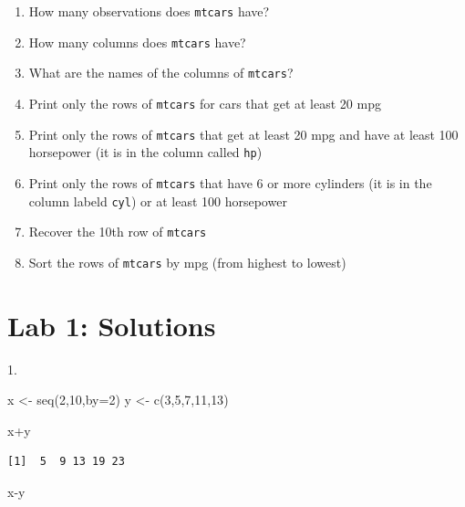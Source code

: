 \documentclass[
  letterpaper,
  DIV=11,
  numbers=noendperiod]{scrreprt}
\newenvironment{Shaded}{\begin{snugshade}}{\end{snugshade}}
\newcommand{\AttributeTok}[1]{\textcolor[rgb]{0.40,0.45,0.13}{#1}}
\newcommand{\DecValTok}[1]{\textcolor[rgb]{0.68,0.00,0.00}{#1}}
\newcommand{\FunctionTok}[1]{\textcolor[rgb]{0.28,0.35,0.67}{#1}}
\newcommand{\NormalTok}[1]{\textcolor[rgb]{0.00,0.23,0.31}{#1}}
\newcommand{\OtherTok}[1]{\textcolor[rgb]{0.00,0.23,0.31}{#1}}
\newcommand{\SpecialCharTok}[1]{\textcolor[rgb]{0.37,0.37,0.37}{#1}}
\begin{document}
\begin{enumerate}
  \begin{enumerate}
  \def\labelenumii{\alph{enumii})}
  \item
    How many observations does \texttt{mtcars} have?
  \item
    How many columns does \texttt{mtcars} have?
  \item
    What are the names of the columns of \texttt{mtcars}?
  \item
    Print only the rows of \texttt{mtcars} for cars that get at least 20
    mpg
  \item
    Print only the rows of \texttt{mtcars} that get at least 20 mpg and
    have at least 100 horsepower (it is in the column called
    \texttt{hp})
  \item
    Print only the rows of \texttt{mtcars} that have 6 or more cylinders
    (it is in the column labeld \texttt{cyl}) or at least 100 horsepower
  \item
    Recover the 10th row of \texttt{mtcars}
  \item
    Sort the rows of \texttt{mtcars} by mpg (from highest to lowest)
  \end{enumerate}
\end{enumerate}

\section{Lab 1: Solutions}\label{lab-1-solutions}

1.

\begin{Shaded}
\begin{Highlighting}[]
\NormalTok{x }\OtherTok{\textless{}{-}} \FunctionTok{seq}\NormalTok{(}\DecValTok{2}\NormalTok{,}\DecValTok{10}\NormalTok{,}\AttributeTok{by=}\DecValTok{2}\NormalTok{)}
\NormalTok{y }\OtherTok{\textless{}{-}} \FunctionTok{c}\NormalTok{(}\DecValTok{3}\NormalTok{,}\DecValTok{5}\NormalTok{,}\DecValTok{7}\NormalTok{,}\DecValTok{11}\NormalTok{,}\DecValTok{13}\NormalTok{)}

\NormalTok{x}\SpecialCharTok{+}\NormalTok{y}
\end{Highlighting}
\end{Shaded}

\begin{verbatim}
[1]  5  9 13 19 23
\end{verbatim}

\begin{Shaded}
\begin{Highlighting}[]
\NormalTok{x}\SpecialCharTok{{-}}\NormalTok{y}
\end{Highlighting}
\end{Shaded}
\end{document}
